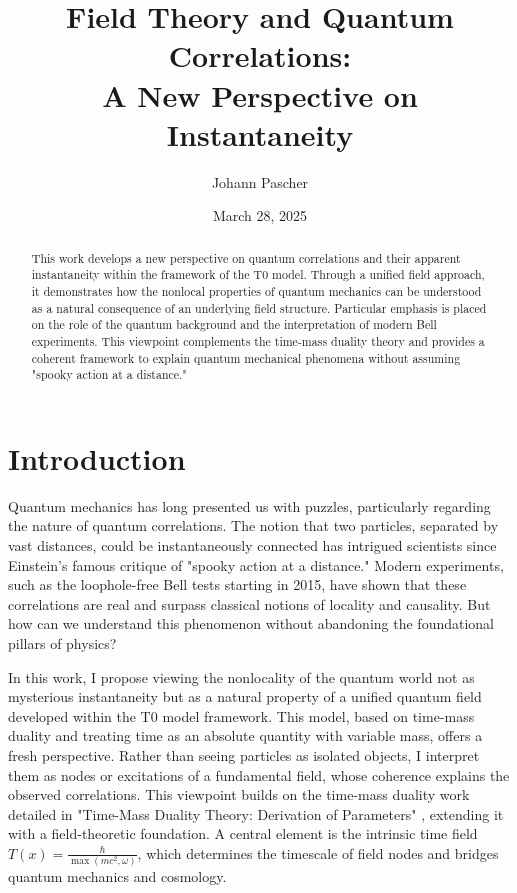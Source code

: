 \documentclass[a4paper,12pt]{article}
\title{Field Theory and Quantum Correlations: \\A New Perspective on Instantaneity}
\author{Johann Pascher}
\date{March 28, 2025}
\newcommand{\Tfield}{T(x)}
\theoremstyle{definition}
\theoremstyle{remark}
\begin{document}
	
	\maketitle
	
	\begin{abstract}
		This work develops a new perspective on quantum correlations and their apparent instantaneity within the framework of the T0 model. Through a unified field approach, it demonstrates how the nonlocal properties of quantum mechanics can be understood as a natural consequence of an underlying field structure. Particular emphasis is placed on the role of the quantum background and the interpretation of modern Bell experiments. This viewpoint complements the time-mass duality theory and provides a coherent framework to explain quantum mechanical phenomena without assuming "spooky action at a distance."
	\end{abstract}
	
	\tableofcontents
	\newpage
	
	\section{Introduction}
	
	Quantum mechanics has long presented us with puzzles, particularly regarding the nature of quantum correlations. The notion that two particles, separated by vast distances, could be instantaneously connected has intrigued scientists since Einstein's famous critique of "spooky action at a distance." Modern experiments, such as the loophole-free Bell tests starting in 2015, have shown that these correlations are real and surpass classical notions of locality and causality. But how can we understand this phenomenon without abandoning the foundational pillars of physics?
	
	In this work, I propose viewing the nonlocality of the quantum world not as mysterious instantaneity but as a natural property of a unified quantum field developed within the T0 model framework. This model, based on time-mass duality and treating time as an absolute quantity with variable mass, offers a fresh perspective. Rather than seeing particles as isolated objects, I interpret them as nodes or excitations of a fundamental field, whose coherence explains the observed correlations. This viewpoint builds on the time-mass duality work detailed in "Time-Mass Duality Theory: Derivation of Parameters" \cite{pascher_params_2025}, extending it with a field-theoretic foundation. A central element is the intrinsic time field \(\Tfield = \frac{\hbar}{\max(m c^2, \omega)}\), which determines the timescale of field nodes and bridges quantum mechanics and cosmology.
	
\end{document}
